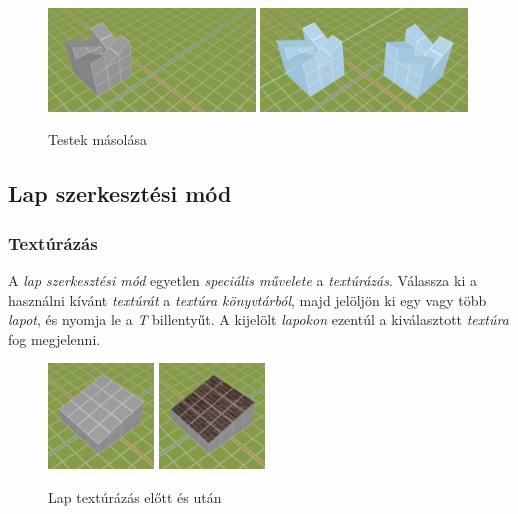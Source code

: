 \begin{figure}[H]
    \centering
    \includegraphics[width=0.49\textwidth]{parts/user-documentation/editor/images/copy1.png}
    \includegraphics[width=0.49\textwidth]{parts/user-documentation/editor/images/copy2.png}
    \caption{Testek másolása}
\end{figure}

\pagebreak

\subsection{Lap szerkesztési mód}

\subsubsection{Textúrázás}

A \emph{lap szerkesztési mód} egyetlen \emph{speciális művelete} a \emph{textúrázás}. Válassza ki a használni kívánt \emph{textúrát} a \emph{textúra könyvtárból}, majd jelöljön ki egy vagy több
\emph{lapot}, és nyomja le a \emph{T} billentyűt. A kijelölt \emph{lapokon} ezentúl a kiválasztott
\emph{textúra} fog megjelenni.

\begin{figure}[H]
    \centering
    \includegraphics[width=0.25\textwidth]{parts/user-documentation/editor/images/tex1.png}
    \includegraphics[width=0.25\textwidth]{parts/user-documentation/editor/images/tex2.png}
    \caption{Lap textúrázás előtt és után}
\end{figure}

